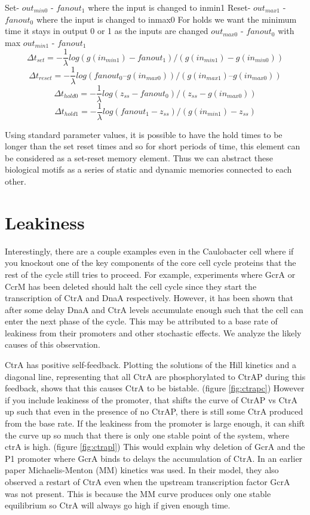 \documentclass{article}
\begin{document}
Set- $out_{min0}$ - $fanout_1$ where the input is changed to inmin1 \newline
Reset- $out_{max1}$ - $fanout_0$ where the input is changed to inmax0 \newline
For holds we want the minimum time it stays in output 0 or 1 as the inputs are changed \newline
$out_{max0}$ - $fanout_0$ with max \newline
$out_{min1}$ - $fanout_1$ \newline
\[\Delta t_{set}= - \frac{1}{\lambda} log(g(in_{min1})-fanout_1)/(g(in_{min1}) -g(in_{min0}))
\]
\[\Delta t_{reset}= -\frac{1}{\lambda} log(fanout_0 –g(in_{max0}))/(g(in_{max1}) – g(in_{max0}))
\]
\[\Delta t_{hold0}= -\frac{1}{\lambda} log(z_{ss} -fanout_0)/(z_{ss} -g(in_{max0}))				
\]
\[\Delta t_{hold1}= -\frac{1}{\lambda} log(fanout_1 -z_{ss})/(g(in_{min1}) -z_{ss})
\]

\newline Using standard parameter values, it is possible to have the hold times to be longer than the set reset times and so for short periods of time, this element can be considered as a set-reset memory element.  Thus we can abstract these biological motifs as a series of static and dynamic memories connected to each other.


\section{Leakiness}
Interestingly, there are a couple examples even in the Caulobacter cell where if you knockout one of the key components of the core cell cycle proteins that the rest of the cycle still tries to proceed.  For example, experiments where GcrA or CcrM has been deleted should halt the cell cycle since they start the transcription of CtrA and DnaA respectively.  However, it has been shown that after some delay DnaA and CtrA levels accumulate enough such that the cell can enter the next phase of the cycle.  This may be attributed to a base rate of leakiness from their promoters and other stochastic effects.  We analyze the likely causes of this observation.

CtrA has positive self-feedback.  Plotting the solutions of the Hill kinetics and a diagonal line, representing that all CtrA are phosphorylated to CtrAP during this feedback, shows that this causes CtrA to be bistable. (figure \ref{fig:ctrapc})  However if you include leakiness of the promoter, that shifts the curve of CtrAP vs CtrA up such that even in the presence of no CtrAP, there is still some CtrA produced from the base rate.  If the leakiness from the promoter is large enough, it can shift the curve up so much that there is only one stable point of the system, where ctrA is high. (figure \ref{fig:ctrapl}) This would explain why deletion of GcrA and the P1 promoter where GcrA binds to delays the accumulation of CtrA.  In an earlier paper \cite{compgenre} Michaelis-Menton (MM) kinetics was used.  In their model, they also observed a restart of CtrA even when the upstream transcription factor GcrA was not present.  This is because the MM curve produces only one stable equilibrium so CtrA will always go high if given enough time.
\end{document}
